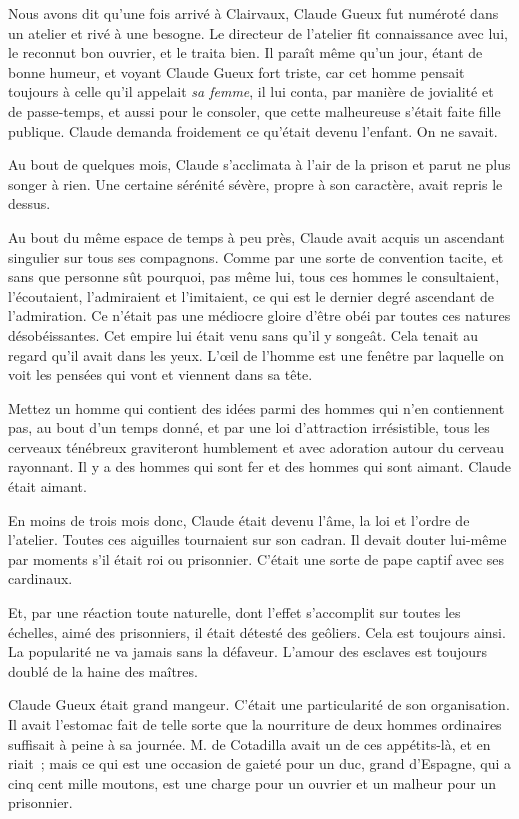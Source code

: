 \documentclass[french,twoside]{book} %
\begin{document}
Nous avons dit qu’une fois arrivé à Clairvaux, Claude Gueux fut numéroté dans un atelier et rivé à une besogne. Le directeur de l’atelier fit connaissance avec lui, le reconnut bon ouvrier, et le traita bien. Il paraît même qu’un jour, étant de bonne humeur, et voyant Claude Gueux fort triste, car cet homme pensait toujours à celle qu’il appelait \emph{sa femme}, il lui conta, par manière de jovialité et de passe-temps, et aussi pour le consoler, que cette malheureuse s’était faite fille publique. Claude demanda froidement ce qu’était devenu l’enfant. On ne savait.\par
Au bout de quelques mois, Claude s’acclimata à l’air de la prison et parut ne plus songer à rien. Une certaine sérénité sévère, propre à son caractère, avait repris le dessus.\par
Au bout du même espace de temps à peu près, Claude avait acquis un ascendant singulier sur tous ses compagnons. Comme par une sorte de convention tacite, et sans que personne sût pourquoi, pas même lui, tous ces hommes le consultaient, l’écoutaient, l’admiraient et l’imitaient, ce qui est le dernier degré  ascendant de l’admiration. Ce n’était pas une médiocre gloire d’être obéi par toutes ces natures désobéissantes. Cet empire lui était venu sans qu’il y songeât. Cela tenait au regard qu’il avait dans les yeux. L’œil de l’homme est une fenêtre par laquelle on voit les pensées qui vont et viennent dans sa tête.\par
Mettez un homme qui contient des idées parmi des hommes qui n’en contiennent pas, au bout d’un temps donné, et par une loi d’attraction irrésistible, tous les cerveaux ténébreux graviteront humblement et avec adoration autour du cerveau rayonnant. Il y a des hommes qui sont fer et des hommes qui sont aimant. Claude était aimant.\par
En moins de trois mois donc, Claude était devenu l’âme, la loi et l’ordre de l’atelier. Toutes ces aiguilles tournaient sur son cadran. Il devait douter lui-même par moments s’il était roi ou prisonnier. C’était une sorte de pape captif avec ses cardinaux.\par
Et, par une réaction toute naturelle, dont l’effet s’accomplit sur toutes les échelles, aimé des prisonniers, il était détesté des geôliers. Cela est toujours ainsi. La popularité ne va jamais sans la défaveur. L’amour des esclaves est toujours doublé de la haine des maîtres.\par
Claude Gueux était grand mangeur. C’était une particularité de son organisation. Il avait l’estomac fait de telle sorte que la nourriture de deux hommes ordinaires suffisait à peine à sa journée. M. de Cotadilla avait un de ces appétits-là, et en riait ; mais ce qui est une occasion de gaieté pour un duc, grand  d’Espagne, qui a cinq cent mille moutons, est une charge pour un ouvrier et un malheur pour un prisonnier.\par
\end{document}
